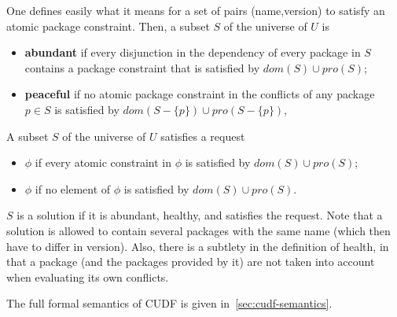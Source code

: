 One defines easily what it means for a set of pairs (name,version) to satisfy
an atomic package constraint. Then, a subset $S$ of the universe of $U$ is
\begin{itemize}
\item \textbf{abundant} if every disjunction in the dependency of every
  package in $S$ contains a package constraint that is satisfied by
  $dom(S)\cup pro(S)$;
\item \textbf{peaceful} if no atomic package constraint in the
  conflicts of any package $p\in S$ is satisfied by $dom(S-\{p\})\cup
  pro(S-\{p\})$,
\end{itemize}
A subset $S$  of the universe of $U$ satisfies a request
\begin{itemize}
\item {} $\phi$ if every atomic constraint
  in $\phi$ is satisfied by $dom(S)\cup pro(S)$;
\item {} $\phi$ if no element of $\phi$ is
  satisfied by $dom(S)\cup pro(S)$.
\end{itemize}
$S$ is a solution if it is abundant, healthy, and satisfies the
request. Note that a solution is allowed to contain several packages
with the same name (which then have to differ in version). Also, there
is a subtlety in the definition of health, in that a package (and the
packages provided by it) are not taken into account when evaluating
its own conflicts.

The full formal semantics of CUDF is given in~\ref{sec:cudf-semantics}.
